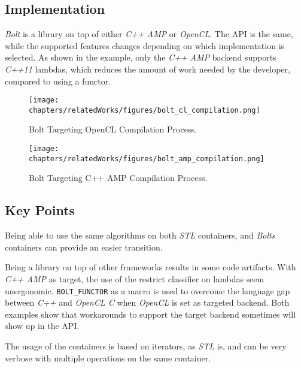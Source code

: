 \subsection{Implementation}
\textit{Bolt} is a library on top of either \textit{C++ AMP} or \textit{OpenCL}\cite{boltPresentation}. The API is the same, while the supported features changes depending on which implementation is selected.
As shown in the example, only the \textit{C++ AMP} backend supports \textit{C++11} lambdas, which reduces the amount of work needed by the developer, compared to using a functor.
\begin{figure}[H]
\center
\texttt{[image: chapters/relatedWorks/figures/bolt\_cl\_compilation.png]}
\caption{Bolt Targeting OpenCL Compilation Process.}
\label{fig:boltClCompilation}
\end{figure}
\begin{figure}
\center
\texttt{[image: chapters/relatedWorks/figures/bolt\_amp\_compilation.png]}
\caption{Bolt Targeting C++ AMP Compilation Process.}
\label{fig:boltAmpCompilation}
\end{figure}

\subsection{Key Points}
Being able to use the same algorithms on both \textit{STL} containers, and \textit{Bolts} containers can provide an easier transition.

Being a library on top of other frameworks results in some code artifacts. With \textit{C++ AMP} as target, the use of the restrict classifier on lambdas seem unergonomic. \texttt{BOLT\_FUNCTOR} as a macro is used to overcome the language gap between \textit{C++} and \textit{OpenCL C} when \textit{OpenCL} is set as targeted backend. Both examples show that workarounds to support the target backend sometimes will show up in the API. 

The usage of the containers is based on iterators, as \textit{STL} is, and can be very verbose with multiple operations on the same container.
